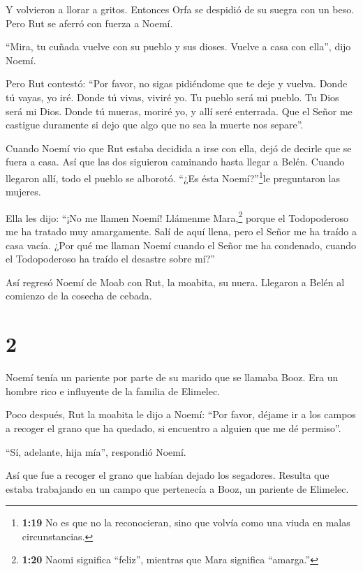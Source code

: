  Y volvieron a llorar a gritos. Entonces Orfa se despidió
de su suegra con un beso. Pero Rut se aferró con fuerza a Noemí.

 ``Mira, tu cuñada vuelve con su pueblo y sus dioses.
Vuelve a casa con ella'', dijo Noemí.

 Pero Rut contestó: ``Por favor, no sigas pidiéndome que te
deje y vuelva. Donde tú vayas, yo iré. Donde tú vivas, viviré yo. Tu
pueblo será mi pueblo. Tu Dios será mi Dios.  Donde tú
mueras, moriré yo, y allí seré enterrada. Que el Señor me castigue
duramente si dejo que algo que no sea la muerte nos separe''.

 Cuando Noemí vio que Rut estaba decidida a irse con ella,
dejó de decirle que se fuera a casa.  Así que las dos
siguieron caminando hasta llegar a Belén. Cuando llegaron allí, todo el
pueblo se alborotó. ``¿Es ésta Noemí?''\footnote{\textbf{1:19} No es que
  no la reconocieran, sino que volvía como una viuda en malas
  circunstancias.}le preguntaron las mujeres.

 Ella les dijo: ``¡No me llamen Noemí! Llámenme
Mara,\footnote{\textbf{1:20} Naomi significa ``feliz'', mientras que
  Mara significa ``amarga.''} porque el Todopoderoso me ha tratado muy
amargamente.  Salí de aquí llena, pero el Señor me ha
traído a casa vacía. ¿Por qué me llaman Noemí cuando el Señor me ha
condenado, cuando el Todopoderoso ha traído el desastre sobre mí?''

 Así regresó Noemí de Moab con Rut, la moabita, su nuera.
Llegaron a Belén al comienzo de la cosecha de cebada.

\hypertarget{section-1}{%
\section{2}\label{section-1}}

 Noemí tenía un pariente por parte de su marido que se
llamaba Booz. Era un hombre rico e influyente de la familia de Elimelec.

 Poco después, Rut la moabita le dijo a Noemí: ``Por favor,
déjame ir a los campos a recoger el grano que ha quedado, si encuentro a
alguien que me dé permiso''.

``Sí, adelante, hija mía'', respondió Noemí.

 Así que fue a recoger el grano que habían dejado los
segadores. Resulta que estaba trabajando en un campo que pertenecía a
Booz, un pariente de Elimelec.

